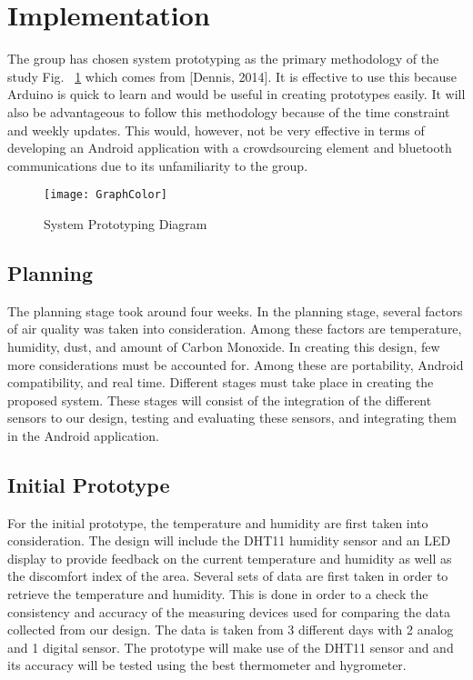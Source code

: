 \section{Implementation}
The group has chosen system prototyping as the primary methodology of the study Fig. ~\ref{fig:SPD} which comes from [Dennis, 2014]. It is effective to use this because Arduino is quick to learn and would be useful in creating prototypes easily. It will also be advantageous to follow this methodology because of the time constraint and weekly updates. This would, however, not be very effective in terms of developing an Android application with a crowdsourcing element and bluetooth communications due to its unfamiliarity to the group. 

\begin{figure}[h]
	\centering
	\texttt{[image: GraphColor]}
	\caption{System Prototyping Diagram}
	\label{fig:SPD}
\end{figure}

\subsection{Planning}
The planning stage took around four weeks. In the planning stage, several factors of air quality was taken into consideration. Among these factors are temperature, humidity, dust, and amount of Carbon Monoxide. In creating this design, few more considerations must be accounted for. Among these are portability, Android compatibility, and real time. Different stages must take place in creating the proposed system. These stages will consist of the integration of the different sensors to our design, testing and evaluating these sensors, and integrating them in the Android application. 

\subsection{Initial Prototype}
For the initial prototype, the temperature and humidity are first taken into consideration. The design will include the DHT11 humidity sensor and an LED display to provide feedback on the current temperature and humidity as well as the discomfort index of the area. Several sets of data are first taken in order to retrieve the temperature and humidity. This is done in order to a check the consistency and accuracy of the measuring devices used for comparing the data collected from our design. The data is taken from 3 different days with 2 analog and 1 digital sensor. The prototype will make use of the DHT11 sensor and and its accuracy will be tested using the best thermometer and hygrometer.

